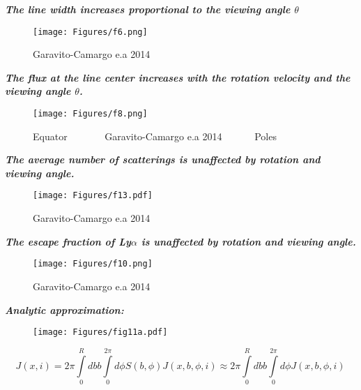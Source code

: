 \documentclass{beamer}
\begin{document}
\begin{frame}{\textit{\textbf{The line width increases proportional to the viewing angle $\theta$}}}
\begin{figure}
\texttt{[image: Figures/f6.png]}
\caption*{Garavito-Camargo e.a 2014}
\end{figure}
\end{frame}

\begin{frame}{\textit{\textbf{The flux at the line center increases with the rotation velocity and the viewing angle $\theta$.}}}
\begin{figure}
\texttt{[image: Figures/f8.png]}
\caption*{Equator \ \ \ \ \ \ \    Garavito-Camargo e.a 2014  \ \ \ \ \ \ Poles}
\end{figure}
\end{frame}

\begin{frame}{\textit{\textbf{The average number of scatterings is unaffected by rotation and viewing angle.}}}
\begin{figure}
\texttt{[image: Figures/f13.pdf]}
\caption*{Garavito-Camargo e.a 2014}
\end{figure}
\end{frame}

\begin{frame}{\textit{\textbf{The escape fraction of Ly$\alpha$ is unaffected by rotation and viewing angle.}}}
\begin{figure}
\texttt{[image: Figures/f10.png]}
\caption*{Garavito-Camargo e.a 2014}
\end{figure}
\end{frame}

\begin{frame}{\textit{\textbf{Analytic approximation:}}}
\begin{figure}
\texttt{[image: Figures/fig11a.pdf]}
\end{figure}


\begin{equation}
J(x, i) = 2\pi \int \limits_0^R db b \int \limits_0^{2\pi}d\phi S(b,\phi)J(x, b, \phi, i) \approx 2\pi \int \limits_0^R db b \int \limits_0^{2\pi}d\phi J(x, b, \phi, i)
\end{equation}
\end{frame}
\end{document}
